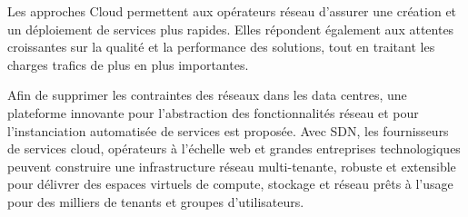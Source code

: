Les approches Cloud permettent aux opérateurs réseau d'assurer une création et un déploiement de services plus rapides. Elles répondent également aux attentes croissantes sur la qualité et la performance des solutions, tout en traitant les charges trafics de plus en plus importantes.



Afin de supprimer les contraintes des réseaux dans les data centres, une plateforme innovante pour l'abstraction des fonctionnalités réseau et pour l'instanciation automatisée de services est proposée. Avec SDN, les fournisseurs de services cloud, opérateurs à l'échelle web et grandes entreprises technologiques peuvent construire une infrastructure réseau multi-tenante, robuste et extensible pour délivrer des espaces virtuels de compute, stockage et réseau prêts à l'usage pour des milliers de tenants et groupes d'utilisateurs.



